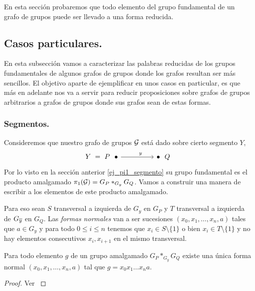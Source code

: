 \documentclass[tesis.tex]{subfiles}
\begin{document}
En esta sección probaremos que todo elemento del grupo fundamental de un grafo de grupos puede ser llevado a una forma reducida.

\subsection{Casos particulares.}

En esta subsección vamos a caracterizar las palabras reducidas de los grupos fundamentales de algunos grafos de grupos donde los grafos resultan ser más sencillos.
El objetivo aparte de ejemplificar en unos casos en particular, es que más en adelante nos va a servir para reducir proposiciones sobre grafos de grupos arbitrarios a grafos de grupos donde sus grafos sean de estas formas.

\subsubsection{Segmentos.}
Consideremos que nuestro grafo de grupos ${\cal G}$ está dado sobre cierto segmento $Y$,
\[\begin{tikzcd}
Y \ = \  	{P \ \ \bullet} && {\bullet \ \ Q}
	\arrow["y"{pos=0.6}, from=1-1, to=1-3]
\end{tikzcd}\]
Por lo visto en la sección anterior \ref{ej_pi1_segmento} su grupo fundamental es el producto amalgamado $\pi_1({\cal G}) = G_P \ast_{G_y} G_Q$. 
Vamos a construir una manera de escribir a los elementos de este producto amalgamado.

Para eso sean $S$ transversal a izquierda de $G_{y}$ en $G_P$ y $T$ transversal a izquierda de $G_{\overline y}$ en $G_{Q}$.
Las \emph{formas normales} van a ser sucesiones $(x_0,x_1,\dots, x_n ,a)$ tales que $a \in G_{y}$ y para todo $0\le  i \le n$ tenemos que $x_{i} \in S \setminus \{ 1 \}$ o bien $x_{i} \in T \setminus \{ 1 \}$ y no hay elementos consecutivos $x_{i}, x_{i+1}$ en el mismo transversal.

\begin{prop}\label{prop_amalgamado_formanormal}
	Para todo elemento $g$ de un grupo amalgamado $G_P \ast_{G_y} G_Q$ existe una única forma normal $(x_0,x_1,\dots,x_n,a)$ tal que $g= x_0x_1\dots x_n a$.
\end{prop}
\begin{proof}
	Ver \cite{lyndon1977combinatorial}
\end{proof}
 
\end{document}
